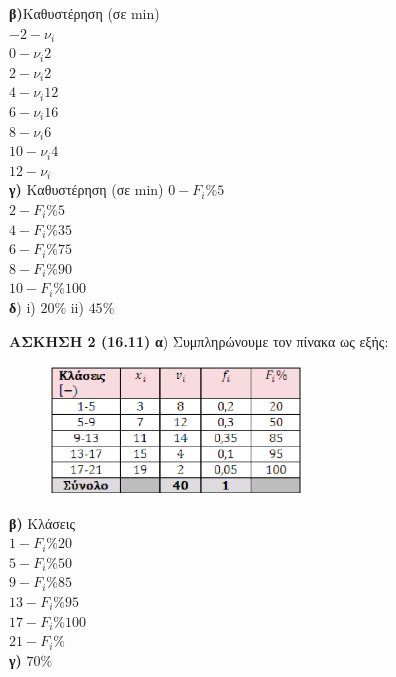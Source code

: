 \documentclass[11pt,a4paper]{article}
\begin{document}
\textbf{β)}Καθυστέρηση (σε \textlatin{min}) \\
$-2-\nu_i$\\
$0-\nu_i2$\\
$2-\nu_i2$\\
$4-\nu_i12$\\
$6-\nu_i16$\\
$8-\nu_i6$\\
$10-\nu_i4$\\
$12-\nu_i$\\


\textbf{ γ)  }Καθυστέρηση (σε \textlatin{min})
$0-F_i\%5$\\
$2-F_i\%5$\\
$4-F_i\%35$\\
$6-F_i\%75$\\
$8-F_i\%90$\\
$10-F_i\%100$\\

\textbf{ δ}) i) $20\%$  ii)  $ 45\%$\\
\newpage

\textbf{ ΑΣΚΗΣΗ 2 (16.11)    }
\textbf{α}) Συμπληρώνουμε τον πίνακα ως εξής:

\begin{figure}[hbtp]
\includegraphics[width=0.6\textwidth, scale=0.5]{A2.eps}
\end{figure}

\textbf{ β)  }Κλάσεις \\
$1-F_i\%20$\\
$5-F_i\%50$\\
$9-F_i\%85$\\
$13-F_i\%95$\\
$17-F_i\%100$\\
$21-F_i\%$\\

\textbf{ γ) }$70\%$\\
\end{document}
